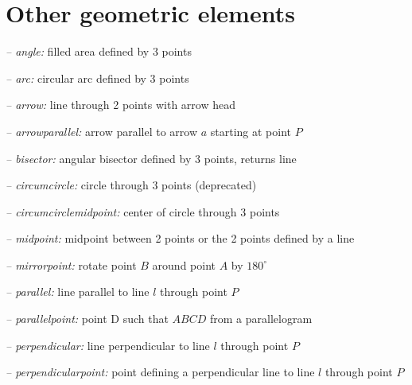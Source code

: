 \section{Other geometric elements}
{\sl -- angle:} \hfill filled area defined by 3 points
\par{\sl -- arc:} \hfill circular arc defined by 3 points
\par{\sl -- arrow:} \hfill line through 2 points with arrow head
\par{\sl -- arrowparallel:} \hfill arrow parallel to arrow $a$ starting at point $P$
\par{\sl -- bisector:} \hfill angular bisector defined by 3 points, returns line
\par{\sl -- circumcircle:} \hfill circle through 3 points (deprecated)
\par{\sl -- circumcirclemidpoint:} \hfill center of circle through 3 points
\par{\sl -- midpoint:} midpoint between 2 points or the 2 points defined by a line

\par{\sl -- mirrorpoint:} \hfill rotate point $B$ around point $A$ by $180^\circ$
\par{\sl -- parallel:} \hfill line parallel to line $l$ through point $P$
\par{\sl -- parallelpoint:} \hfill point D such that $ABCD$ from a parallelogram
\par{\sl -- perpendicular:} \hfill line perpendicular to line $l$ through point $P$
\par{\sl -- perpendicularpoint:} \hfill  point defining a perpendicular line to line $l$ through point $P$

